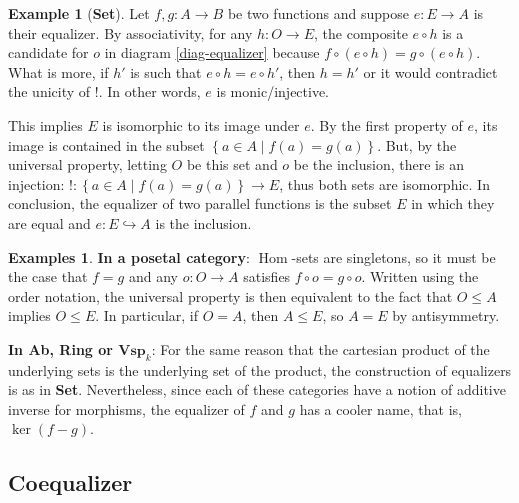 \documentclass{article}
\theoremstyle{definition}
\newtheorem{exmp}[thm]{Example}
\newtheorem{exmps}[thm]{Examples}
\theoremstyle{remark}
\DeclareMathOperator{\Hom}{Hom}
\begin{document}
\begin{exmp}[\textbf{Set}]
    Let $f,g:A\rightarrow B$ be two functions and suppose $e:E\rightarrow A$ is their equalizer. By associativity, for any $h:O\rightarrow E$, the composite $e\circ h$ is a candidate for $o$ in diagram \eqref{diag-equalizer} because $f\circ (e \circ h) = g \circ (e \circ h)$. What is more, if $h'$ is such that $e \circ h = e\circ h'$, then $h= h'$ or it would contradict the unicity of $!$. In other words, $e$ is monic/injective.

    This implies $E$ is isomorphic to its image under $e$. By the first property of $e$, its image is contained in the subset $\left\{ a \in A \mid f(a) = g(a)\right\}$. But, by the universal property, letting $O$ be this set and $o$ be the inclusion, there is an injection: $!: \left\{ a \in A \mid f(a) = g(a)\right\} \rightarrow E$, thus both sets are isomorphic. In conclusion, the equalizer of two parallel functions is the subset $E$ in which they are equal and $e:E \hookrightarrow A$ is the inclusion.
\end{exmp}
\begin{exmps}
    \textbf{In a posetal category}: $\Hom$-sets are singletons, so it must be the case that $f = g$ and any $o:O \rightarrow A$ satisfies $f\circ o = g\circ o$. Written using the order notation, the universal property is then equivalent to the fact that $O \leq A$ implies $O \leq E$. In particular, if $O= A$, then $A\leq E$, so $A = E$ by antisymmetry.

    \textbf{In Ab, Ring or $\textbf{Vsp}_k$}: For the same reason that the cartesian product of the underlying sets is the underlying set of the product, the construction of equalizers is as in \textbf{Set}. Nevertheless, since each of these categories have a notion of additive inverse for morphisms, the equalizer of $f$ and $g$ has a cooler name, that is, $\ker(f-g)$.

\end{exmps}

\subsection{Coequalizer}
\end{document}
